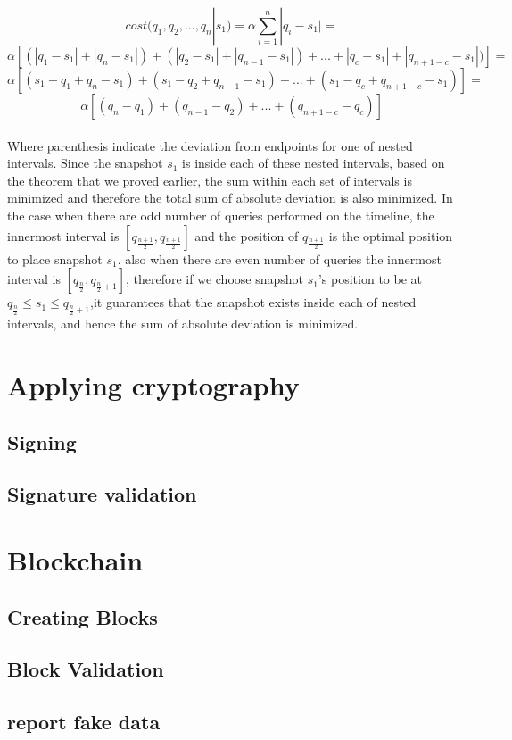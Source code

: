 $$cost(q_1,q_2,...,q_n|s_1)=\alpha\sum_{i=1}^n |q_i-s_1| = $$
$$\alpha[(|q_1-s_1|+|q_n-s_1|)+(|q_2-s_1|+|q_{n-1}-s_1|)+...+|q_c-s_1|+|q_{n+1-c}-s_1|)]=$$
$$\alpha[(s_1-q_1+q_n-s_1)+(s_1-q_2+q_{n-1}-s_1)+...+(s_1-q_c+q_{n+1-c}-s_1)]=$$
$$\alpha[(q_n-q_1)+(q_{n-1}-q_2)+...+(q_{n+1-c}-q_c)]$$\\
Where parenthesis indicate the deviation from endpoints for one of nested intervals. Since the snapshot $s_1$ is inside each of these nested intervals, based on the theorem that we proved earlier, the sum within each set of intervals is minimized and therefore the total sum of absolute deviation is also minimized. In the case when there are odd number of queries performed on the timeline, the innermost interval is $[q_{\frac{n+1}{2}},q_{\frac{n+1}{2}}]$ and the position of $q_{\frac{n+1}{2}}$ is the optimal position to place snapshot $s_1$. also when there are even number of queries the innermost interval is $[q_{\frac{n}{2}},q_{\frac{n}{2}+1}]$, therefore if we choose snapshot $s_1$'s position to be at $q_{\frac{n}{2}}\leq s_1\leq q_{\frac{n}{2}+1}$,it guarantees that the snapshot exists inside each of nested intervals, and hence the sum of absolute deviation is minimized. 



\section{Applying cryptography}
\subsection{Signing}
\subsection{Signature validation}
\section{Blockchain}
\subsection{Creating Blocks}
\subsection{Block Validation}
\subsection{report fake data}

